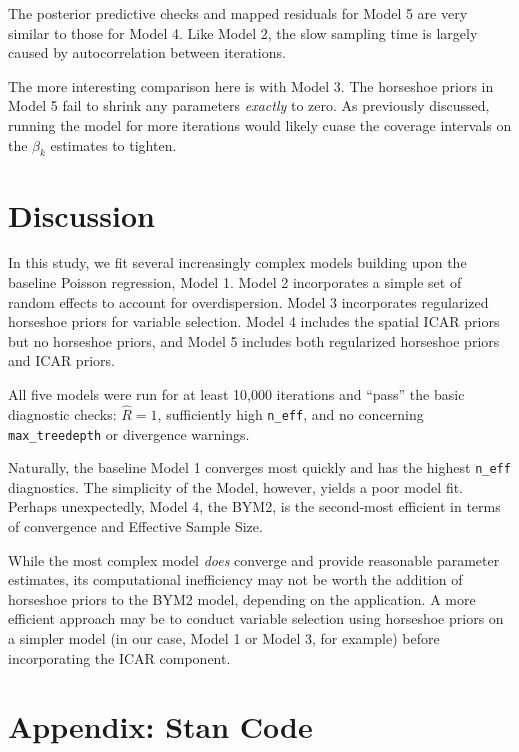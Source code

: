 \documentclass[
]{article}
\begin{document}
The posterior predictive checks and mapped residuals for Model 5 are
very similar to those for Model 4. Like Model 2, the slow sampling time
is largely caused by autocorrelation between iterations.

The more interesting comparison here is with Model 3. The horseshoe
priors in Model 5 fail to shrink any parameters \emph{exactly} to zero.
As previously discussed, running the model for more iterations would
likely cuase the coverage intervals on the \(\beta_k\) estimates to
tighten.

\hypertarget{discussion}{%
\section{Discussion}\label{discussion}}

In this study, we fit several increasingly complex models building upon
the baseline Poisson regression, Model 1. Model 2 incorporates a simple
set of random effects to account for overdispersion. Model 3
incorporates regularized horseshoe priors for variable selection. Model
4 includes the spatial ICAR priors but no horseshoe priors, and Model 5
includes both regularized horseshoe priors and ICAR priors.

All five models were run for at least 10,000 iterations and ``pass'' the
basic diagnostic checks: \(\hat{R} = 1\), sufficiently high
\texttt{n\_eff}, and no concerning \texttt{max\_treedepth} or divergence
warnings.

Naturally, the baseline Model 1 converges most quickly and has the
highest \texttt{n\_eff} diagnostics. The simplicity of the Model,
however, yields a poor model fit. Perhaps unexpectedly, Model 4, the
BYM2, is the second-most efficient in terms of convergence and Effective
Sample Size.

While the most complex model \emph{does} converge and provide reasonable
parameter estimates, its computational inefficiency may not be worth the
addition of horseshoe priors to the BYM2 model, depending on the
application. A more efficient approach may be to conduct variable
selection using horseshoe priors on a simpler model (in our case, Model
1 or Model 3, for example) before incorporating the ICAR component.

\hypertarget{appendix-stan-code}{%
\section{Appendix: Stan Code}\label{appendix-stan-code}}
\end{document}
